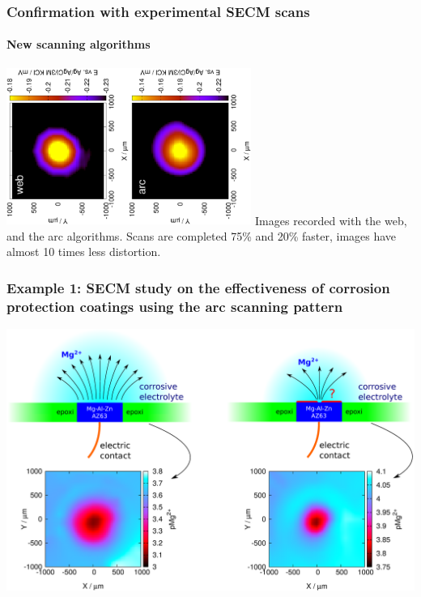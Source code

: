 \documentclass{beamer}
\begin{document}
\begin{frame}
	\frametitle{Confirmation with experimental SECM scans}
	\framesubtitle{New scanning algorithms}
	\includegraphics[width=0.3\textwidth, angle=-90]{web.eps}\includegraphics[width=0.3\textwidth, angle=-90]{arc.eps}
	\vfill
	Images recorded with the web, and the arc algorithms.
	\vfill
	Scans are completed 75\% and 20\% faster, images have almost 10 times less distortion.
\end{frame}


\begin{frame}
	\frametitle{Example 1: SECM study on the effectiveness of corrosion protection coatings using the arc scanning pattern}
	\centering
	\includegraphics[width=1\textwidth]{nickel.eps}
\end{frame}
\end{document}
